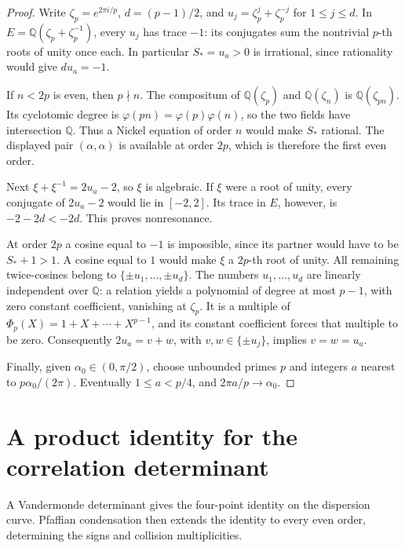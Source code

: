 \documentclass[11pt]{article}
\numberwithin{equation}{section}
\theoremstyle{remark}\newtheorem{remark}[theorem]{Remark}
\begin{document}
\begin{proof}
Write $\zeta_p=e^{2\pi i/p}$, $d=(p-1)/2$, and
$u_j=\zeta_p^j+\zeta_p^{-j}$ for $1\leq j\leq d$. In
$E=\mathbb Q(\zeta_p+\zeta_p^{-1})$, every $u_j$ has trace $-1$:
its conjugates sum the nontrivial $p$-th roots of unity once each.
In particular $S_*=u_a>0$ is irrational, since rationality would give
$d u_a=-1$.

If $n<2p$ is even, then $p\nmid n$. The compositum of
$\mathbb Q(\zeta_p)$ and $\mathbb Q(\zeta_n)$ is
$\mathbb Q(\zeta_{pn})$. Its cyclotomic degree is
$\varphi(pn)=\varphi(p)\varphi(n)$, so the two fields have intersection
$\mathbb Q$. Thus a Nickel equation of order $n$ would make $S_*$
rational. The displayed pair $(\alpha,\alpha)$ is available at order
$2p$, which is therefore the first even order.

Next $\xi+\xi^{-1}=2u_a-2$, so $\xi$ is algebraic. If $\xi$ were a
root of unity, every conjugate of $2u_a-2$ would lie in $[-2,2]$.
Its trace in $E$, however, is $-2-2d<-2d$. This proves nonresonance.

At order $2p$ a cosine equal to $-1$ is impossible, since its partner
would have to be $S_*+1>1$. A cosine equal to $1$ would make $\xi$
a $2p$-th root of unity. All remaining twice-cosines belong to
$\{\pm u_1,\ldots,\pm u_d\}$. The numbers $u_1,\ldots,u_d$ are
linearly independent over $\mathbb Q$: a relation yields a polynomial
of degree at most $p-1$, with zero constant coefficient, vanishing at
$\zeta_p$. It is a multiple of $\Phi_p(X)=1+X+\cdots+X^{p-1}$, and
its constant coefficient forces that multiple to be zero.
Consequently $2u_a=v+w$, with $v,w\in\{\pm u_j\}$, implies
$v=w=u_a$.

Finally, given $\alpha_0\in(0,\pi/2)$, choose unbounded primes $p$
and integers $a$ nearest to $p\alpha_0/(2\pi)$. Eventually
$1\leq a<p/4$, and $2\pi a/p\to\alpha_0$.
\end{proof}

\section{A product identity for the correlation determinant}
\label{sec:elementary-pfaffian}\label{sec:determinant-local}

A Vandermonde determinant gives the four-point identity on the
dispersion curve. Pfaffian condensation then extends the identity to
every even order, determining the signs and collision multiplicities.
\end{document}
